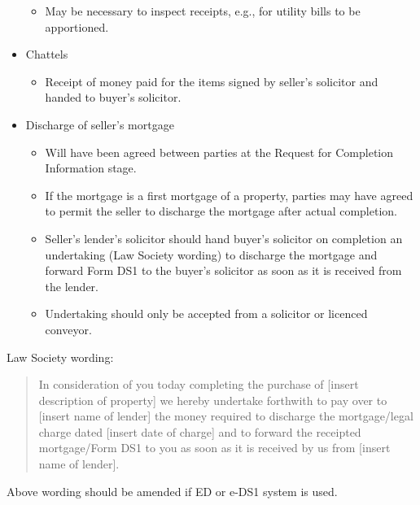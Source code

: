 \documentclass[
]{article}
\newenvironment{Shaded}{}{}
\newcommand{\NormalTok}[1]{#1}
\providecommand{\tightlist}{%
  \setlength{\itemsep}{0pt}\setlength{\parskip}{0pt}}
\begin{document}
\begin{itemize}
  \begin{itemize}
  \tightlist
  \item
    May be necessary to inspect receipts, e.g., for utility bills to be
    apportioned.\\
  \end{itemize}
\item
  Chattels

  \begin{itemize}
  \tightlist
  \item
    Receipt of money paid for the items signed by seller's solicitor and
    handed to buyer's solicitor.
  \end{itemize}
\item
  Discharge of seller's mortgage

  \begin{itemize}
  \tightlist
  \item
    Will have been agreed between parties at the Request for Completion
    Information stage.
  \item
    If the mortgage is a first mortgage of a property, parties may have
    agreed to permit the seller to discharge the mortgage after actual
    completion.
  \item
    Seller's lender's solicitor should hand buyer's solicitor on
    completion an undertaking (Law Society wording) to discharge the
    mortgage and forward Form DS1 to the buyer's solicitor as soon as it
    is received from the lender.
  \item
    Undertaking should only be accepted from a solicitor or licenced
    conveyor.
  \end{itemize}
\end{itemize}

Law Society wording:

\begin{quote}
In consideration of you today completing the purchase of {[}insert
description of property{]} we hereby undertake forthwith to pay over to
{[}insert name of lender{]} the money required to discharge the
mortgage/legal charge dated {[}insert date of charge{]} and to forward
the receipted mortgage/Form DS1 to you as soon as it is received by us
from {[}insert name of lender{]}.
\end{quote}

\begin{Shaded}
\begin{Highlighting}[]
\NormalTok{Above wording should be amended if ED or e{-}DS1 system is used. }
\end{Highlighting}
\end{Shaded}
\end{document}
